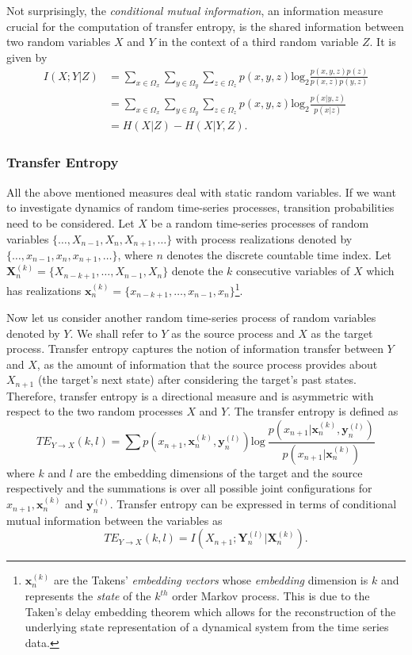 \documentclass[12pt]{article}
\begin{document}
Not surprisingly, the \textit{conditional mutual information}, an information measure crucial for the computation of transfer entropy, is the shared information between two random variables $X$ and $Y$ in the context of a third random variable $Z$. It is given by
\begin{align*}
I(X;Y | Z) &= \sum_{x \in \Omega_x}^{}\sum_{y \in \Omega_y}^{}\sum_{z \in \Omega_z}^{}p(x,y,z)\text{log}_2\frac{p(x,y,z)p(z)}{p(x,z)p(y,z)} \\
&= \sum_{x \in \Omega_x}^{}\sum_{y \in \Omega_y}^{}\sum_{z \in \Omega_z}^{}p(x,y,z)\text{log}_2\frac{p(x|y,z)}{p(x|z)}\\
&= H(X|Z) - H(X|Y,Z).
\end{align*}
\subsubsection{Transfer Entropy}
All the above mentioned measures deal with static random variables. If we want to investigate dynamics of random time-series processes, transition probabilities need to be considered. Let $X$ be a random time-series processes of random variables $\{\dots, X_{n-1}, X_n, X_{n+1}, \dots\}$ with process realizations denoted by $\{\dots, x_{n-1}, x_n, x_{n+1}, \dots\}$, where $n$ denotes the discrete countable time index. Let $\boldsymbol{X}_n^{(k)} = \{X_{n-k+1},\dots,X_{n-1}, X_n\}$ denote the $k$ consecutive variables of $X$ which has realizations $\boldsymbol{x}_n^{(k)} = \{x_{n-k+1},\dots,x_{n-1}, x_n\}$\footnote{$\boldsymbol{x}_n^{(k)}$ are the Takens' \textit{embedding vectors} whose \textit{embedding} dimension is $k$ and represents the \textit{state} of the $k^{th}$ order Markov process. This is due to the Taken's delay embedding theorem which allows for the reconstruction of the underlying state representation of a dynamical system from the time series data.}. 

Now let us consider another random time-series process of random variables denoted by $Y$. We shall refer to $Y$ as the source process and $X$ as the target process. Transfer entropy captures the notion of information transfer between $Y$ and $X$, as the amount of information that the source process provides about $X_{n+1}$ (the target's next state) after considering the target's past states. Therefore, transfer entropy is a directional measure and is asymmetric with respect to the two random processes $X$ and $Y$. The transfer entropy is defined as 
\begin{equation*}
TE_{Y \rightarrow X}(k,l) = \sum_{}^{}p(x_{n+1}, \boldsymbol{x}_n^{(k)}, \boldsymbol{y}_n^{(l)})\text{log}~\frac{p(x_{n+1} | \boldsymbol{x}_n^{(k)}, \boldsymbol{y}_n^{(l)})}{p(x_{n+1}|\boldsymbol{x}_n^{(k)})}
\end{equation*}
where $k$ and $l$ are the embedding dimensions of the target and the source respectively and the summations is over all possible joint configurations for $x_{n+1}, \boldsymbol{x}_n^{(k)}$ and $\boldsymbol{y}_n^{(l)}$. 
Transfer entropy can be expressed in terms of conditional mutual information between the variables as
\begin{equation*}
TE_{Y \rightarrow X}(k,l) = I(X_{n+1}; \boldsymbol{Y}_n^{(l)}|\boldsymbol{X}_n^{(k)}).
\end{equation*}
\end{document}
